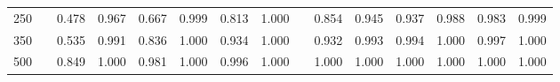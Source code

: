 % 
\begin{tabular}{ccccccccccccccc}
  \hline
  \hline
250 &  & 0.478 & 0.967 & 0.667 & 0.999 & 0.813 & 1.000 &  & 0.854 & 0.945 & 0.937 & 0.988 & 0.983 & 0.999 \\ 
  350 &  & 0.535 & 0.991 & 0.836 & 1.000 & 0.934 & 1.000 &  & 0.932 & 0.993 & 0.994 & 1.000 & 0.997 & 1.000 \\ 
  500 &  & 0.849 & 1.000 & 0.981 & 1.000 & 0.996 & 1.000 &  & 1.000 & 1.000 & 1.000 & 1.000 & 1.000 & 1.000 \\ 
   \hline
\end{tabular}
